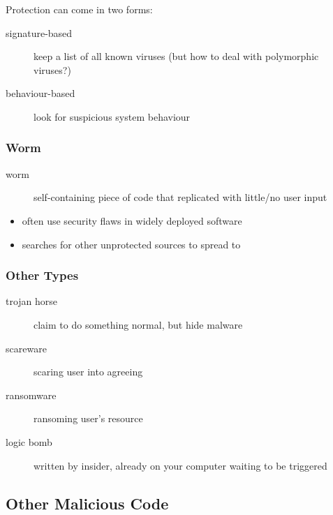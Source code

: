 \documentclass[]{article}
\theoremstyle{definition}
\begin{document}
	Protection can come in two forms:
	\begin{description}
		\item[signature-based] keep a list of all known viruses (but how to deal with polymorphic viruses?)
		\item[behaviour-based] look for suspicious system behaviour
	\end{description}

	\subsubsection{Worm}
	\begin{description}
		\item[worm] self-containing piece of code that replicated with little/no user input
	\end{description}
	\begin{itemize}
		\item often use security flaws in widely deployed software
		\item searches for other unprotected sources to spread to
	\end{itemize}

	\subsubsection{Other Types}
	\begin{description}
		\item[trojan horse] claim to do something normal, but hide malware
		\item[scareware] scaring user into agreeing
		\item[ransomware] ransoming user's resource
		\item[logic bomb] written by insider, already on your computer waiting to be triggered
	\end{description}

	\subsection{Other Malicious Code}
\end{document}
